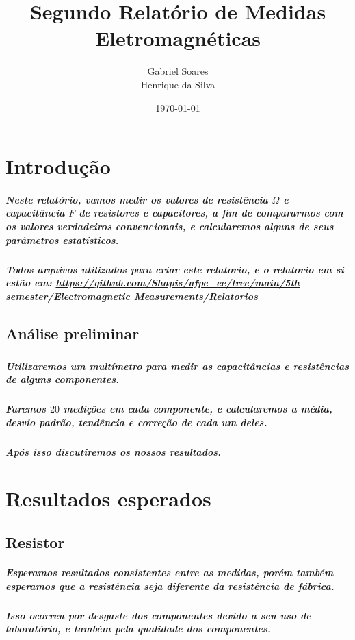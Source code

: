 \documentclass[12pt,twoside, a4paper, twocolumn]{article}
\title{Segundo Relatório de Medidas Eletromagnéticas}
\author{Gabriel Soares \\ Henrique da Silva}
\date{\today}
\begin{document}
\maketitle
{}
\newpage
\tableofcontents
\newpage



\section{Introdução}


\subparagraph*{Neste relatório, vamos medir os valores de resistência $\varOmega$ e capacitância $F$ de resistores e capacitores, a fim de compararmos com os valores verdadeiros convencionais, e calcularemos alguns de seus parâmetros estatísticos.}

\subparagraph*{Todos arquivos utilizados para criar este relatorio, e o relatorio em si estão em:  \url{https://github.com/Shapis/ufpe_ee/tree/main/5th semester/Electromagnetic Measurements/Relatorios}}




\subsection{Análise preliminar}
\subparagraph*{}


\subparagraph*{Utilizaremos um multímetro para medir as capacitâncias e resistências de alguns componentes.}

\subparagraph*{Faremos $20$ medições em cada componente, e calcularemos a média, desvio padrão, tendência e correção de cada um deles.}

\subparagraph*{Após isso discutiremos os nossos resultados.}

\section{Resultados esperados}

\subsection{Resistor}

\subparagraph*{Esperamos resultados consistentes entre as medidas, porém também esperamos que a resistência seja diferente da resistência de fábrica.}

\subparagraph*{Isso ocorreu por desgaste dos componentes devido a seu uso de laboratório, e também pela qualidade dos componentes.}
\end{document}
